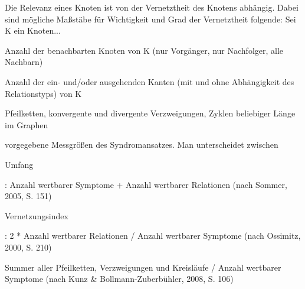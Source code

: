 \documentclass[enabledeprecatedfontcommands,fontsize=11pt,paper=a4,twoside]{scrartcl}
\newcounter{one}
\newcounter{two}[one]
\let\tempone\itemize
\let\temptwo\enditemize
\renewenvironment{itemize}{\tempone\addtolength{\itemsep}{-10.0pt}}{\temptwo}
\begin{document}
\begin{description}
	\item[\hypertarget{Bedeutung eines Knoten}{Bedeutung eines Knoten}] Die Relevanz eines Knoten ist von der Vernetztheit des Knotens abhängig. Dabei sind mögliche Maßstäbe für Wichtigkeit und Grad der Vernetztheit folgende: Sei K ein Knoten... 
		\begin{itemize}
			\setlength{\itemsep}{0.5pt}
			\item Anzahl der benachbarten Knoten von K (nur Vorgänger, nur Nachfolger, alle Nachbarn)
			\item Anzahl der ein- und/oder ausgehenden Kanten (mit und ohne Abhängigkeit des Relationstyps) von K
			\item Pfeilketten, konvergente und divergente Verzweigungen, Zyklen beliebiger Länge im Graphen
		\end{itemize}
	\item[\hypertarget{Metriken}{Metriken/Graphmaße}] vorgegebene Messgrößen des Syndromansatzes. Man unterscheidet zwischen
		\begin{itemize}
			\setlength{\itemsep}{0.5pt}
			\item \hypertarget{Umfang}{Umfang}: Anzahl wertbarer Symptome + Anzahl wertbarer Relationen (nach Sommer, 2005, S. 151)
			\item \hypertarget{Vernetzungsindex}{Vernetzungsindex}: 2 * Anzahl wertbarer Relationen / Anzahl wertbarer Symptome (nach Ossimitz, 2000, S. 210)
			\item Summer aller Pfeilketten, Verzweigungen und Kreisläufe / Anzahl wertbarer Symptome (nach Kunz \& Bollmann-Zuberbühler, 2008, S. 106)
		\end{itemize}
\end{description}
	

\newpage
\end{document}
